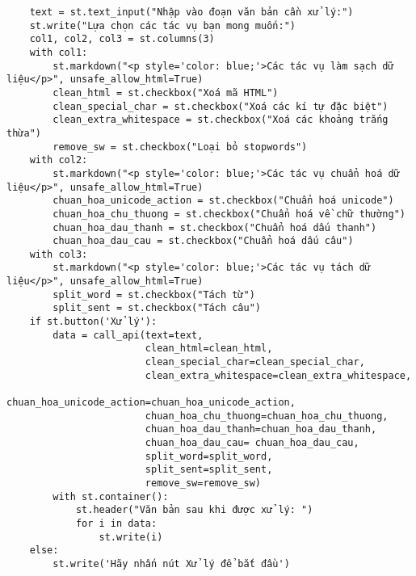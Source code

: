 \begin{verbatim}
    text = st.text_input("Nhập vào đoạn văn bản cần xử lý:")
    st.write("Lựa chọn các tác vụ bạn mong muốn:")
    col1, col2, col3 = st.columns(3)
    with col1:
        st.markdown("<p style='color: blue;'>Các tác vụ làm sạch dữ liệu</p>", unsafe_allow_html=True)
        clean_html = st.checkbox("Xoá mã HTML")
        clean_special_char = st.checkbox("Xoá các kí tự đặc biệt")
        clean_extra_whitespace = st.checkbox("Xoá các khoảng trắng thừa")
        remove_sw = st.checkbox("Loại bỏ stopwords")
    with col2:
        st.markdown("<p style='color: blue;'>Các tác vụ chuẩn hoá dữ liệu</p>", unsafe_allow_html=True)
        chuan_hoa_unicode_action = st.checkbox("Chuẩn hoá unicode")
        chuan_hoa_chu_thuong = st.checkbox("Chuẩn hoá về chữ thường")
        chuan_hoa_dau_thanh = st.checkbox("Chuẩn hoá dấu thanh")
        chuan_hoa_dau_cau = st.checkbox("Chuẩn hoá dấu câu")
    with col3:
        st.markdown("<p style='color: blue;'>Các tác vụ tách dữ liệu</p>", unsafe_allow_html=True)
        split_word = st.checkbox("Tách từ")
        split_sent = st.checkbox("Tách câu")
    if st.button('Xử lý'):
        data = call_api(text=text,
                        clean_html=clean_html,
                        clean_special_char=clean_special_char,
                        clean_extra_whitespace=clean_extra_whitespace,
                        chuan_hoa_unicode_action=chuan_hoa_unicode_action,
                        chuan_hoa_chu_thuong=chuan_hoa_chu_thuong,
                        chuan_hoa_dau_thanh=chuan_hoa_dau_thanh,
                        chuan_hoa_dau_cau= chuan_hoa_dau_cau,
                        split_word=split_word,
                        split_sent=split_sent,
                        remove_sw=remove_sw)
        with st.container():
            st.header("Văn bản sau khi được xử lý: ")
            for i in data:
                st.write(i)
    else:
        st.write('Hãy nhấn nút Xử lý để bắt đầu')
\end{verbatim}
